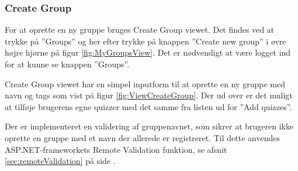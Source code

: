\subsubsection{Create Group}
For at oprette en ny gruppe bruges Create Group viewet. Det findes ved at trykke på ''Groups'' og her efter trykke på knappen ''Create new group'' i øvre højre hjørne på figur \ref{fig:MyGroupsView}. Det er nødvendigt at være logget ind for at kunne se knappen ''Groups''.

Create Group viewet har en simpel inputform til at oprette en ny gruppe med navn og tags som vist på figur \ref{fig:ViewCreateGroup}. Der ud over er det muligt at tilføje brugerens egne quizzer med det samme fra listen ud for ''Add quizzes''.

Der er implementeret en validering af gruppenavnet, som sikrer at brugeren ikke oprette en gruppe med et navn der allerede er registreret. Til dette anvendes ASP.NET-frameworkets Remote Validation funktion, se afsnit \ref{sec:remoteValidation} på side \pageref{sec:remoteValidation}.

